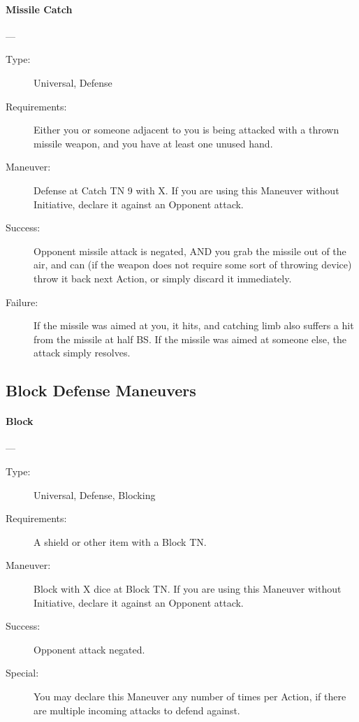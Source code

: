\documentclass[oneside,11pt,english]{book}
\begin{document}
\paragraph{\large\label{man:Missile Catch}Missile Catch}---\quad{\large[2+X]}
\vspace{-10pt}\begin{description} 
\item [Type:] Universal, Defense 
\item [Requirements:] Either you or someone adjacent to you is being attacked with a thrown missile weapon, 
and you have at least one unused hand. 
\item [Maneuver:] Defense at Catch TN 9 with X. If you are using this Maneuver without Initiative, declare it 
against an Opponent attack. 
\item [Success:] Opponent missile attack is negated, AND you grab the missile out of the air, and can (if the 
weapon does not require some sort of throwing device) throw it back next Action, or simply discard it 
immediately. 
\item [Failure:] If the missile was aimed at you, it hits, and catching limb also suffers a hit from the missile at 
half BS. If the missile was aimed at someone else, the attack simply resolves. 
\end{description}
\subsection{Block Defense Maneuvers}
\paragraph{\large\label{man:Block}Block}---\quad{\large[X]}
\vspace{-10pt}\begin{description} 
\item [Type:] Universal, Defense, Blocking 
\item [Requirements:] A shield or other item with a Block TN. 
\item [Maneuver:] Block with X dice at Block TN. If you are using this Maneuver without Initiative, declare it 
against an Opponent attack. 
\item [Success:] Opponent attack negated. 
\item [Special:] You may declare this Maneuver any number of times per Action, if there are multiple incoming 
attacks to defend against. 
\end{description}
\end{document}
